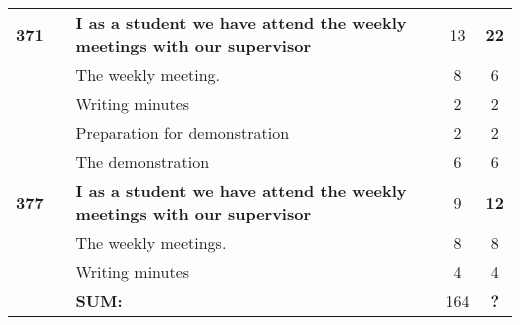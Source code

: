 \begin{longtable}{ccXcc}
\midrule		
\textbf{371} 	& {C1}
	& {\bf I as a student we have attend the weekly meetings with our supervisor} 	& 	13	& \textbf{22} \\
				&& The weekly meeting.	& 8 & 6 \\
				&& Writing minutes 	&  2 & 2 \\	
				&& Preparation for demonstration	&  2 & 2 \\
				&& The demonstration	&  6 & 6 \\

\textbf{377} 	& {C1}
	& {\bf I as a student we have attend the weekly meetings with our supervisor} 	& 	9	& \textbf{12} \\
				&& The weekly meetings.	& 8 & 8 \\
				&& Writing minutes 	&  4 & 4 \\	
				
\hline
				&& \textbf{SUM:}		&		164	& \textbf{?}\\																			
\bottomrule[1mm]
\end{longtable}